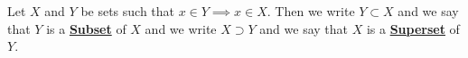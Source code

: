 \newcommand{\QSubset}[0]{\textbf{\hyperref[def:Subset]{Subset}}\xspace}
\newcommand{\QSubsets}[0]{\textbf{\hyperref[def:Subset]{Subsets}}\xspace}
\newcommand{\Superset}[0]{\textbf{\hyperref[def:Subset]{Superset}}\xspace}
\newcommand{\Supersets}[0]{\textbf{\hyperref[def:Subset]{Supersets}}\xspace}
\begin{df}[Subset]
\label{def:Subset}
\rm
    Let $X$ and 
    $Y$ be sets
    such that $x \in Y\implies x \in X$. 
    Then we write $Y \subset X$ 
    and we say that $Y$ is a 
    \QSubset of $X$
    and we write $X \supset Y$
    and we say that $X$ is a 
    \Superset of $Y$. 
\end{df}
